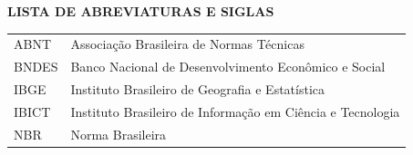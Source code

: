\listoffigures
\newpage

\listoftables
\newpage

\begin{center}
  \textbf{LISTA DE ABREVIATURAS E SIGLAS}
\end{center}

\vspace{2\baselineskip}

\noindent
\begin{tabular}{p{2.5cm} p{11cm}}
  ABNT  & Associação Brasileira de Normas Técnicas \\[6pt]
  BNDES & Banco Nacional de Desenvolvimento Econômico e Social \\[6pt]
  IBGE  & Instituto Brasileiro de Geografia e Estatística \\[6pt]
  IBICT & Instituto Brasileiro de Informação em Ciência e Tecnologia \\[6pt]
  NBR   & Norma Brasileira \\
\end{tabular}

\newpage

\tableofcontents
\newpage

